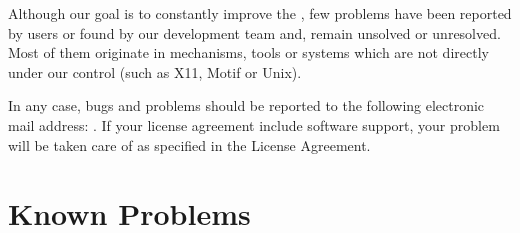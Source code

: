 Although our goal is to constantly improve the \COPRSDE, few problems
have been reported by users or found by our development team and, remain
unsolved or unresolved. Most of them originate in mechanisms, tools or
systems which are not directly under our control (such as X11, Motif or
Unix).

In any case, bugs and problems should be reported to the following electronic
mail address:\*
.\*
If your license agreement include software support, your problem will be taken
care of as specified in the License Agreement.



\section{Known Problems}

